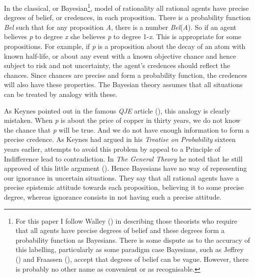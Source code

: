 \documentclass[
  10pt,
  letterpaper,
  DIV=11,
  numbers=noendperiod,
  twoside]{scrartcl}
\begin{document}
In the classical, or Bayesian\footnote{For this paper I follow Walley
  () in describing those theorists who
  require that all agents have precise degrees of belief and these
  degrees form a probability function as Bayesians. There is some
  dispute as to the accuracy of this labelling, particularly as some
  paradigm case Bayesians, such as Jeffrey
  () and Fraassen
  (), accept that degrees of belief
  can be vague. However, there is probably no other name as convenient
  or as recognisable.}, model of rationality all rational agents have
precise degrees of belief, or credences, in each proposition. There is a
probability function \emph{Bel} such that for any proposition \emph{A},
there is a number \emph{Bel}(\emph{A}). So if an agent believes \emph{p}
to degree \emph{x} she believes \emph{p} to degree 1-\emph{x}. This is
appropriate for some propositions. For example, if \emph{p} is a
proposition about the decay of an atom with known half-life, or about
any event with a known objective chance and hence subject to risk and
not uncertainty, the agent's credences should reflect the chances. Since
chances are precise and form a probability function, the credences will
also have these properties. The Bayesian theory assumes that all
situations can be treated by analogy with these.

As Keynes pointed out in the famous \emph{QJE} article
(), this analogy is clearly
mistaken. When \emph{p} is about the price of copper in thirty years, we
do not know the chance that \emph{p} will be true. And we do not have
enough information to form a precise credence. As Keynes had argued in
his \emph{Treatise on Probability} sixteen years earlier, attempts to
avoid this problem by appeal to a Principle of Indifference lead to
contradiction. In \emph{The General Theory} he noted that he still
approved of this little argument (). Hence Bayesians have no way of representing our ignorance in
uncertain situations. They say that all rational agents have a precise
epistemic attitude towards each proposition, believing it to some
precise degree, whereas ignorance consists in not having such a precise
attitude.
\end{document}
